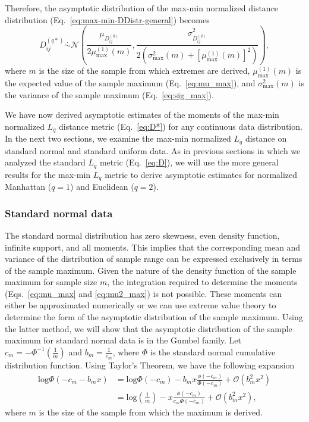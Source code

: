 \documentclass[aos]{imsart}
\begin{document}
Therefore, the asymptotic distribution of the max-min normalized distance distribution (Eq.~\ref{eq:max-min-DDistr-general}) becomes
%
\begin{equation}\label{eq:max-min_DDistr}
D^{(q*)}_{ij} \overset{.}{\sim} \mathcal{N}\left(\frac{\mu_{D^{(q)}_{ij}}}{2\mu^{(1)}_\text{max}(m)}, \frac{\sigma^2_{D^{(q)}_{ij}}}{2\left(\sigma^2_\text{max}(m) + \left[\mu^{(1)}_\text{max}(m)\right]^2\right)}\right),
\end{equation}
%
where $m$ is the size of the sample from which extremes are derived, $\mu^{(1)}_\text{max}(m)$ is the expected value of the sample maximum (Eq.~\ref{eq:mu_max}), and $\sigma^2_\text{max}(m)$ is the variance of the sample maximum (Eq.~\ref{eq:sig_max}). 

We have now derived asymptotic estimates of the moments of the max-min normalized $L_q$ distance metric (Eq.~\ref{eq:D*}) for any continuous data distribution. In the next two sections, we examine the max-min normalized $L_q$ distance on standard normal and standard uniform data. As in previous sections in which we analyzed the standard $L_q$ metric (Eq.~\ref{eq:D}), we will use the more general results for the max-min $L_q$ metric to derive asymptotic estimates for normalized Manhattan ($q=1$) and Euclidean ($q=2$).

\subsubsection{Standard normal data}

The standard normal distribution has zero skewness, even density function, infinite support, and all moments. This implies that the corresponding mean and variance of the distribution of sample range can be expressed exclusively in terms of the sample maximum. Given the nature of the density function of the sample maximum for sample size $m$, the integration required to determine the moments (Eqs.~\ref{eq:mu_max} and \ref{eq:mu2_max}) is not possible. These moments can either be approximated numerically or we can use extreme value theory to determine the form of the asymptotic distribution of the sample maximum. Using the latter method, we will show that the asymptotic distribution of the sample maximum for standard normal data is in the Gumbel family. Let $c_m = -\Phi^{-1}\left(\frac{1}{m}\right)$ and $b_m = \frac{1}{c_m}$, where $\Phi$ is the standard normal cumulative distribution function. Using Taylor's Theorem, we have the following expansion
%
\begin{equation}\label{eq:log_expand}
\begin{aligned}
\text{log}\Phi(-c_m - b_m x) &= \text{log}\Phi(-c_m) - b_m x \frac{\phi(-c_m)}{\Phi(-c_m)} + \mathcal{O}(b^2_m x^2) \\
&= \text{log}\left(\frac{1}{m}\right) - x \frac{\phi(-c_m)}{c_m \Phi(-c_m)} + \mathcal{O}(b^2_m x^2),
\end{aligned}
\end{equation}
%
where $m$ is the size of the sample from which the maximum is derived.
\end{document}
